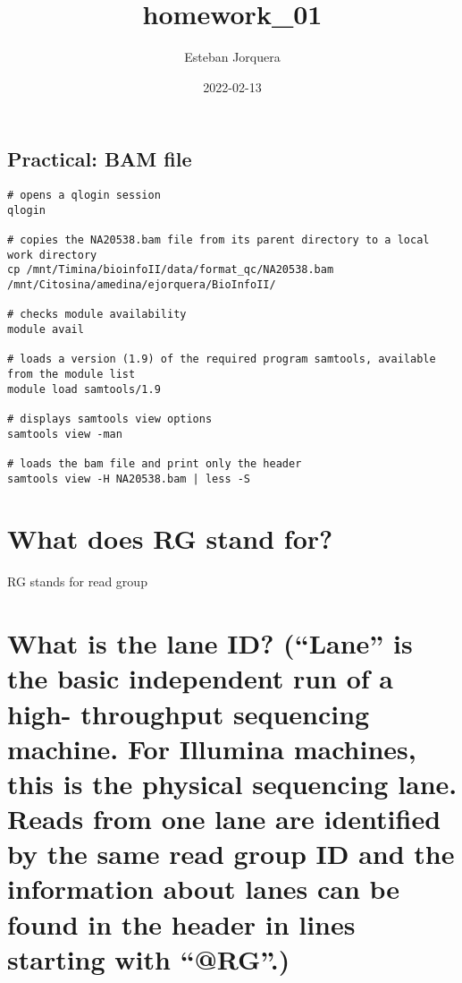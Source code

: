 \documentclass[
]{article}
\title{homework\_01}
\author{Esteban Jorquera}
\date{2022-02-13}
\begin{document}
\maketitle

\hypertarget{practical-bam-file}{%
\subsection{Practical: BAM file}\label{practical-bam-file}}

\begin{verbatim}
# opens a qlogin session 
qlogin

# copies the NA20538.bam file from its parent directory to a local work directory
cp /mnt/Timina/bioinfoII/data/format_qc/NA20538.bam /mnt/Citosina/amedina/ejorquera/BioInfoII/

# checks module availability   
module avail

# loads a version (1.9) of the required program samtools, available from the module list
module load samtools/1.9

# displays samtools view options
samtools view -man

# loads the bam file and print only the header
samtools view -H NA20538.bam | less -S
\end{verbatim}

\hypertarget{what-does-rg-stand-for}{%
\section{What does RG stand for?}\label{what-does-rg-stand-for}}

RG stands for read group

\hypertarget{what-is-the-lane-id-lane-is-the-basic-independent-run-of-a-high--throughput-sequencing-machine.-for-illumina-machines-this-is-the-physical-sequencing-lane.-reads-from-one-lane-are-identified-by-the-same-read-group-id-and-the-information-about-lanes-can-be-found-in-the-header-in-lines-starting-with-rg.}{%
\section{What is the lane ID? (``Lane'' is the basic independent run of
a high- throughput sequencing machine. For Illumina machines, this is
the physical sequencing lane. Reads from one lane are identified by the
same read group ID and the information about lanes can be found in the
header in lines starting with
``@RG''.)}\label{what-is-the-lane-id-lane-is-the-basic-independent-run-of-a-high--throughput-sequencing-machine.-for-illumina-machines-this-is-the-physical-sequencing-lane.-reads-from-one-lane-are-identified-by-the-same-read-group-id-and-the-information-about-lanes-can-be-found-in-the-header-in-lines-starting-with-rg.}}
\end{document}
